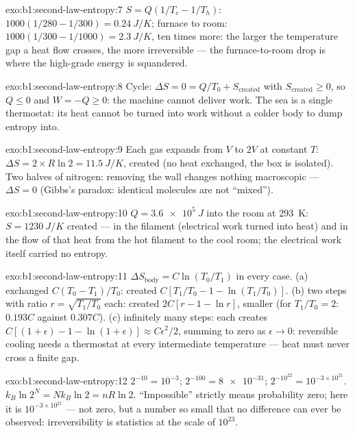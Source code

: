 \begin{solution}{exo:b1:second-law-entropy:7}
$S = Q(1/T_c - 1/T_h)$: $1000(1/280 - 1/300) = \qty{0.24}{J/K}$; furnace to
room: $1000(1/300 - 1/1000) = \qty{2.3}{J/K}$, ten times more: the larger
the temperature gap a heat flow crosses, the more irreversible --- the
furnace-to-room drop is where the high-grade energy is squandered.
\end{solution}

\begin{solution}{exo:b1:second-law-entropy:8}
Cycle: $\Delta S = 0 = Q/T_0 + S_{\mathrm{created}}$ with $S_{\mathrm{created}} \geq 0$,
so $Q \leq 0$ and $W = -Q \geq 0$: the machine cannot deliver work. The
sea is a single thermostat: its heat cannot be turned into work without
a colder body to dump entropy into.
\end{solution}

\begin{solution}{exo:b1:second-law-entropy:9}
Each gas expands from $V$ to $2V$ at constant $T$: $\Delta S = 2 \times R\ln2
= \qty{11.5}{J/K}$, created (no heat exchanged, the box is isolated). Two
halves of nitrogen: removing the wall changes nothing macroscopic ---
$\Delta S = 0$ (Gibbs's paradox: identical molecules are not ``mixed'').
\end{solution}

\begin{solution}{exo:b1:second-law-entropy:10}
$Q = \qty{3.6e5}{J}$ into the room at \qty{293}{K}: $S = \qty{1230}{J/K}$
created --- in the filament (electrical work turned into heat) and in the
flow of that heat from the hot filament to the cool room; the electrical
work itself carried no entropy.
\end{solution}

\begin{solution}{exo:b1:second-law-entropy:11}
$\Delta S_{\text{body}} = C\ln(T_0/T_1)$ in every case. (a) exchanged
$C(T_0 - T_1)/T_0$: created $C[T_1/T_0 - 1 - \ln(T_1/T_0)]$. (b) two steps
with ratio $r = \sqrt{T_1/T_0}$ each: created $2C[r - 1 - \ln r]$, smaller
(for $T_1/T_0 = 2$: $0.193C$ against $0.307C$). (c) infinitely many steps:
each creates $C[(1 + \epsilon) - 1 - \ln(1 + \epsilon)] \approx C\epsilon^2/2$,
summing to zero as $\epsilon \to 0$: reversible cooling needs a thermostat
at every intermediate temperature --- heat must never cross a finite gap.
\end{solution}

\begin{solution}{exo:b1:second-law-entropy:12}
$2^{-10} = 10^{-3}$; $2^{-100} = \num{8e-31}$; $2^{-10^{22}} = 10^{-3\times10^{21}}$.
$k_B\ln2^N = Nk_B\ln2 = nR\ln2$. ``Impossible'' strictly means probability
zero; here it is $10^{-3\times10^{21}}$ --- not zero, but a number so small that
no difference can ever be observed: irreversibility is statistics at
the scale of $10^{23}$.
\end{solution}


